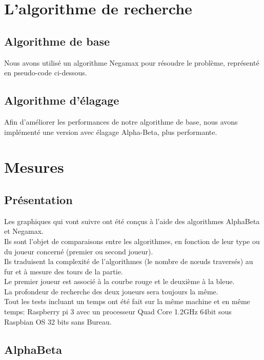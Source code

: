\documentclass[12pt]{article}
\begin{document}
\section{L'algorithme de recherche}
\subsection{Algorithme de base}

Nous avons utilisé un algorithme Negamax pour résoudre le problème, représenté en pseudo-code ci-dessous.



\newpage
\subsection{Algorithme d'élagage}

Afin d'améliorer les performances de notre algorithme de base, nous avons implémenté une version avec élagage Alpha-Beta, plus performante.



\newpage
\section{Mesures}

\subsection{Présentation}

Les graphiques qui vont suivre ont été conçus à l’aide des algorithmes AlphaBeta et Negamax.\\
Ils sont l’objet de comparaisons entre les algorithmes, en fonction de leur type ou du joueur concerné (premier ou second joueur).\\
Ils traduisent la complexité de l’algorithmes (le nombre de nœuds traversés) au fur et à mesure des tours de la partie.\\
Le premier joueur est associé à la courbe rouge et le deuxième à la bleue.\\
La profondeur de recherche des deux joueurs sera toujours la même.\\

Tout les tests incluant un temps ont été fait sur la même machine et en même temps: Raspberry pi 3 avec un processeur Quad Core 1.2GHz 64bit sous Raspbian OS 32 bits sans Bureau.
\newpage
\subsection{AlphaBeta}
\end{document}
